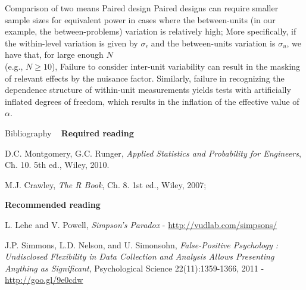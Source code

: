 \documentclass[t]{beamer}
\begin{document}
\begin{ftstf}
{Comparison of two means}
{Paired design}
Paired designs can require smaller sample sizes for equivalent power in cases where the between-units (in our example, the between-problems) variation is relatively high;
\vhalf
More specifically, if the within-level variation is given by $\sigma_\epsilon$ and the between-units variation is $\sigma_u$, we have that, for large enough $N$\\(e.g., $N\geq 10$),
\beqs
{}\approx{}
\eqs
\vhalf
Failure to consider inter-unit variability can result in the masking of relevant effects by the nuisance factor.
\vhalf
Similarly, failure in recognizing the dependence structure of within-unit measurements yields tests with artificially inflated degrees of freedom, which results in the inflation of the effective value of $\alpha$.
\end{ftstf}


\begin{ftst}
{Bibliography}
{\ }
\scriptsize
\textbf{Required reading}

\benums D.C. Montgomery, G.C. Runger, \textit{Applied Statistics and Probability for Engineers}, Ch. 10. 5th ed., Wiley, 2010. 
\item M.J. Crawley, \textit{The R Book}, Ch. 8. 1st ed., Wiley, 2007;
\eenum

\textbf{Recommended reading}

\benums L. Lehe and V. Powell, \textit{Simpson's Paradox} - \url{http://vudlab.com/simpsons/} 
\item J.P. Simmons, L.D. Nelson, and U. Simonsohn, \textit{False-Positive Psychology : Undisclosed Flexibility in Data Collection and Analysis Allows Presenting Anything as Significant}, Psychological Science 22(11):1359-1366, 2011 - \url{http://goo.gl/9e0cdw}
\eenum
\end{ftst}

\end{document}

